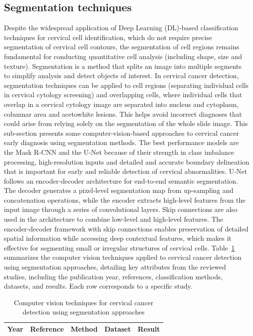 \documentclass[final,5p,times,twocolumn,authoryear]{elsarticle}
\begin{document}
\subsection{Segmentation techniques}
Despite the widespread application of Deep Learning (DL)‑based classification techniques for cervical cell identification, which do not require precise segmentation of cervical cell contours, the segmentation of cell regions remains fundamental for conducting quantitative cell analysis (including shape, size and texture). Segmentation is a method that splits an image into multiple segments to simplify analysis and detect objects of interest. In cervical cancer detection, segmentation techniques can be applied to cell regions (separating individual cells in cervical cytology screening) and overlapping cells, where individual cells that overlap in a cervical cytology image are separated into nucleus and cytoplasm, columnar area and acetowhite lesions. This helps avoid incorrect diagnoses that could arise from relying solely on the segmentation of the whole slide image.
This sub‑section presents some computer‑vision‑based approaches to cervical cancer early diagnosis using segmentation methods. The best performance models are the Mask R‑CNN and the U‑Net because of their strength in class imbalance processing, high‑resolution inputs and detailed and accurate boundary delineation that is important for early and reliable detection of cervical abnormalities. U‑Net follows an encoder‑decoder architecture for end‑to‑end semantic segmentation. The decoder generates a pixel‑level segmentation map from up‑sampling and concatenation operations, while the encoder extracts high‑level features from the input image through a series of convolutional layers. Skip connections are also used in the architecture to combine low‑level and high‑level features. The encoder‑decoder framework with skip connections enables preservation of detailed spatial information while accessing deep contextual features, which makes it effective for segmenting small or irregular structures of cervical cells.
Table~\ref{tab:segmentation} summarizes the computer vision techniques applied to cervical cancer detection using segmentation approaches, detailing key attributes from the reviewed studies, including the publication year, references, classification methods, datasets, and results. Each row corresponds to a specific study.
\begin{table}
\centering
\caption{Computer vision techniques for cervical cancer detection using segmentation approaches}
\label{tab:segmentation}
\begin{tabular}{|l|l|l|l|l|}
\hline
\textbf{Year} & \textbf{Reference} & \textbf{Method} & \textbf{Dataset} & \textbf{Result} \\
\hline
\hline
\end{tabular}
\end{table}
\end{document}
